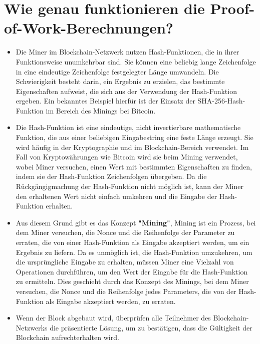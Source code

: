 \documentclass[ngerman]{scrreprt}
\begin{document}
\section{Wie genau funktionieren die Proof-of-Work-Berechnungen?}
\begin{itemize}
	\item {Die Miner im Blockchain-Netzwerk nutzen Hash-Funktionen, die in ihrer Funktionsweise unumkehrbar sind. Sie können eine beliebig lange Zeichenfolge in eine eindeutige Zeichenfolge festgelegter Länge umwandeln. Die Schwierigkeit besteht darin, ein Ergebnis zu erzielen, das bestimmte Eigenschaften aufweist, die sich aus der Verwendung der Hash-Funktion ergeben. Ein bekanntes Beispiel hierfür ist der Einsatz der SHA-256-Hash-Funktion im Bereich des Minings bei Bitcoin.}
	\item{Die Hash-Funktion ist eine eindeutige, nicht invertierbare mathematische Funktion, die aus einer beliebigen Eingabestring eine feste Länge erzeugt. Sie wird häufig in der Kryptographie und im Blockchain-Bereich verwendet. Im Fall von Kryptowährungen wie Bitcoin wird sie beim Mining verwendet, wobei Miner versuchen, einen Wert mit bestimmten Eigenschaften zu finden, indem sie der Hash-Funktion Zeichenfolgen übergeben. Da die Rückgängigmachung der Hash-Funktion nicht möglich ist, kann der Miner den erhaltenen Wert nicht einfach umkehren und die Eingabe der Hash-Funktion erhalten.}
	\item{Aus diesem Grund gibt es das Konzept \textbf{"Mining"}, Mining ist ein Prozess, bei dem Miner versuchen, die Nonce und die Reihenfolge der Parameter zu erraten, die von einer Hash-Funktion als Eingabe akzeptiert werden, um ein Ergebnis zu liefern. Da es unmöglich ist, die Hash-Funktion umzukehren, um die ursprüngliche Eingabe zu erhalten, müssen Miner eine Vielzahl von Operationen durchführen, um den Wert der Eingabe für die Hash-Funktion zu ermitteln. Dies geschieht durch das Konzept des Minings, bei dem Miner versuchen, die Nonce und die Reihenfolge jedes Parameters, die von der Hash-Funktion als Eingabe akzeptiert werden, zu erraten.}
	\item{Wenn der Block abgebaut wird, überprüfen alle Teilnehmer des Blockchain-Netzwerks die präsentierte Lösung, um zu bestätigen, dass die Gültigkeit der Blockchain aufrechterhalten wird.}
\end{itemize}
\end{document}
